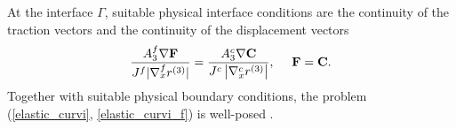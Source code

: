 At the interface $\Gamma$, suitable physical interface conditions are the continuity of the traction vectors and the continuity of the displacement vectors 
\begin{equation}\label{interface_cond}
\frac{A_3^f\nabla{\bf F}}{J^f|\nabla_x^f r^{(3)}|}  = \frac{A_3^c\nabla{\bf C}}{J^c\left|\nabla_x^c r^{(3)}\right|}, \ \ \ \ {\bf F} = {\bf C}.
\end{equation}
Together with suitable physical boundary conditions, the problem (\ref{elastic_curvi}, \ref{elastic_curvi_f}) is well-posed \cite{duru2014stable, petersson2015wave}.



